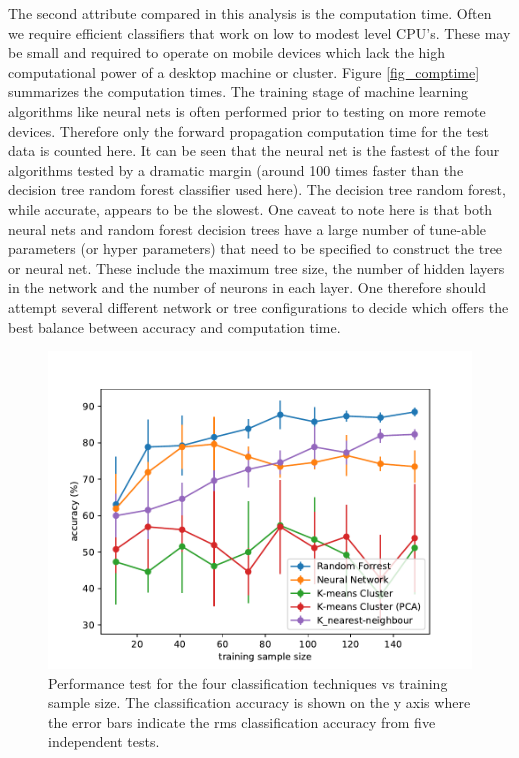 \documentclass[10pt]{article}
\begin{document}
The second attribute compared in this analysis is the computation time. Often we require efficient classifiers that work on low to modest level CPU's. These may be small and required to operate on mobile devices which lack the high computational power of a desktop machine or cluster. Figure \ref{fig_comptime} summarizes the computation times. The training stage of machine learning algorithms like neural nets is often performed prior to testing on more remote devices. Therefore only the forward propagation computation time for the test data is counted here. It can be seen that the neural net is the fastest of the four algorithms tested by a dramatic margin (around 100 times faster than the decision tree random forest classifier used here). The decision tree random forest, while accurate, appears to be the slowest. One caveat to note here is that both neural nets and random forest decision trees have a large number of tune-able parameters (or hyper parameters) that need to be specified to construct the tree or neural net. These include the maximum tree size, the number of hidden layers in the network and the number of neurons in each layer. One therefore should attempt several different network or tree configurations to decide which offers the best balance between accuracy and computation time.



\begin{figure}
\begin{center}
\includegraphics[scale=1.0,angle=0,trim=0cm 0cm 0cm 0cm]{comparison_accuracy.pdf}
\caption{Performance test for the four classification techniques vs training sample size. The classification accuracy is shown on the y axis where the error bars indicate the rms classification accuracy from five independent tests.}
\label{fig_acc}
\end{center}
\end{figure} 
\end{document}
